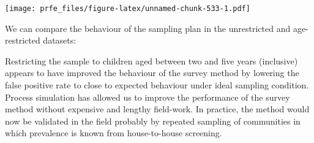 \documentclass[12pt,a4paper]{book}
\newenvironment{Shaded}{\begin{snugshade}}{\end{snugshade}}
\newcommand{\KeywordTok}[1]{\textcolor[rgb]{0.13,0.29,0.53}{\textbf{#1}}}
\newcommand{\DataTypeTok}[1]{\textcolor[rgb]{0.13,0.29,0.53}{#1}}
\newcommand{\DecValTok}[1]{\textcolor[rgb]{0.00,0.00,0.81}{#1}}
\newcommand{\FloatTok}[1]{\textcolor[rgb]{0.00,0.00,0.81}{#1}}
\newcommand{\StringTok}[1]{\textcolor[rgb]{0.31,0.60,0.02}{#1}}
\newcommand{\OtherTok}[1]{\textcolor[rgb]{0.56,0.35,0.01}{#1}}
\newcommand{\OperatorTok}[1]{\textcolor[rgb]{0.81,0.36,0.00}{\textbf{#1}}}
\newcommand{\NormalTok}[1]{#1}
\theoremstyle{definition}
\theoremstyle{definition}
\theoremstyle{definition}
\theoremstyle{remark}
\begin{document}
\texttt{[image: prfe\_files/figure-latex/unnamed-chunk-533-1.pdf]}

We can compare the behaviour of the sampling plan in the unrestricted
and age-restricted datasets:

\begin{Shaded}
\end{Shaded}

Restricting the sample to children aged between two and five years
(inclusive) appears to have improved the behaviour of the survey method
by lowering the false positive rate to close to expected behaviour under
ideal sampling condition. Process simulation has allowed us to improve
the performance of the survey method without expensive and lengthy
field-work. In practice, the method would now be validated in the field
probably by repeated sampling of communities in which prevalence is
known from house-to-house screening.
\end{document}
